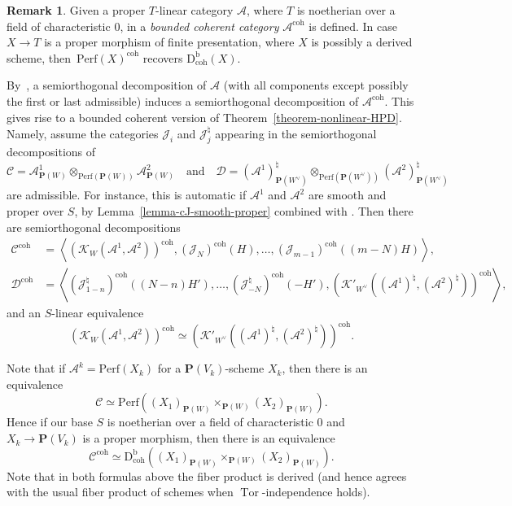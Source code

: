 \documentclass[11pt, reqno]{amsart}
\numberwithin{equation}{section}
\theoremstyle{plain}
\theoremstyle{definition}
\newtheorem{remark}[theorem]{Remark}
\newcommand{\Perf}{\mathrm{Perf}}
\newcommand{\Db}{\mathrm{D^b_{coh}}}
\newcommand{\coh}{\mathrm{coh}}
\newcommand{\hpd}{{\natural}}
\newcommand{\svee}{\scriptscriptstyle\vee}
\newcommand{\cJd}{\mathcal{J}^{\hpd}}
\newcommand{\llangle}{\left \langle}
\newcommand{\rrangle}{\right \rangle}
\DeclareMathOperator{\Tor}{Tor}
\newcommand{\cA}{\mathcal{A}}
\newcommand{\cC}{\mathcal{C}}
\newcommand{\cD}{\mathcal{D}}
\newcommand{\cJ}{\mathcal{J}}
\newcommand{\cK}{\mathcal{K}}
\newcommand{\bP}{\mathbf{P}}
\begin{document}
\begin{remark}
\label{remark-Perf-to-Db}
Given a proper $T$-linear category $\cA$, 
where $T$ is noetherian over a field of characteristic $0$, 
in \cite[Definition 4.27]{NCHPD} a \emph{bounded coherent category} $\cA^{\coh}$ is defined. 
In case~$X \to T$ is a proper morphism of finite presentation, where $X$ is possibly a derived scheme, 
then~$\Perf(X)^{\coh}$ recovers $\Db(X)$. 

By~\cite[Proposition~4.28]{NCHPD}, a semiorthogonal decomposition of $\cA$ (with all 
components except possibly the first or last admissible) induces a semiorthogonal decomposition of $\cA^\coh$. 
This gives rise to a bounded coherent version of Theorem~\ref{theorem-nonlinear-HPD}. 
Namely, assume the categories $\cJ_i$ and $\cJd_j$ appearing in the semiorthogonal decompositions of 
\begin{equation*}
\cC = \cA^1_{\bP(W)} \otimes_{\Perf(\bP(W))} \cA^2_{\bP(W)} 
\quad \text{and} \quad 
\cD = (\cA^1)^{\hpd}_{\bP(W^{\svee})} {\otimes_{\Perf(\bP(W^{\svee}))}} (\cA^2)^{\hpd}_{\bP(W^{\svee})}
\end{equation*} 
are admissible. 
For instance, this is automatic if $\cA^1$ and $\cA^2$ are smooth and proper over $S$, by 
Lemma~\ref{lemma-cJ-smooth-proper} combined with \cite[Lemmas 4.15 and 4.13]{NCHPD}. 
Then there are semiorthogonal decompositions 
\begin{align}
\label{Ccoh-sod} \cC^{\coh} & = 
\llangle (\cK_W(\cA^1, \cA^2))^{\coh}, (\cJ_N)^{\coh}(H), \dots, (\cJ_{m-1})^{\coh}((m-N)H) \rrangle ,    \\ 
\label{Dcoh-sod} \cD^{\coh} & = 
\llangle (\cJd_{1-n})^{\coh}((N-n)H'), \dots, (\cJd_{-N})^{\coh}(-H'), (\cK'_{W^{\svee}}((\cA^1)^{\hpd}, (\cA^2)^{\hpd}))^\coh \rrangle, 
\end{align} 
and an $S$-linear equivalence 
\begin{equation*}
(\cK_W(\cA^1, \cA^2))^\coh \simeq  (\cK'_{W^{\svee}}((\cA^1)^{\hpd}, (\cA^2)^{\hpd}))^{\coh} .  
\end{equation*}

Note that if $\cA^k = \Perf(X_k)$ for a $\bP(V_k)$-scheme $X_k$, 
then there is an equivalence 
\begin{equation*}
\cC \simeq \Perf{ \left( (X_1)_{\bP(W)} \times_{\bP(W)} (X_2)_{\bP(W)} \right) } . 
\end{equation*}
Hence if our base $S$ is noetherian over a field of characteristic $0$ and $X_k \to \bP(V_k)$ is a proper  
morphism, then there is an equivalence  
\begin{equation*}
\cC^\coh \simeq \Db{\left( (X_1)_{\bP(W)} \times_{\bP(W)} (X_2)_{\bP(W)} \right)}. 
\end{equation*} 
Note that in both formulas above the fiber product is derived 
(and hence agrees with the usual fiber product of schemes when $\Tor$-independence holds).
\end{remark}
\end{document}
